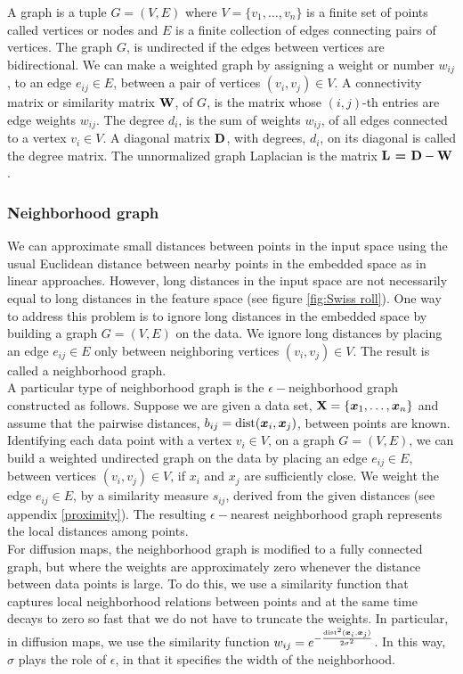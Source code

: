 A graph is a tuple $G = (V,E)$ where $V = \{v_1, \ldots , v_n\}$ is a finite set of points called vertices or nodes and $E$ is a finite collection of edges connecting pairs of vertices. The graph $G$, is undirected if the edges between vertices are bidirectional.
We can make a weighted graph by assigning a weight or number $w_{ij}$, to an edge $e_{ij} \in E$, between a pair of vertices $(v_i, v_j) \in V$. A connectivity matrix or similarity matrix $\textbf{W}$, of $G$, is the matrix whose $(i,j)$-th entries are edge weights $w_{ij}$.
The degree $d_i$, is the sum of weights $w_{ij}$, of all edges connected to a vertex $v_i \in V$.
A diagonal matrix $\textbf{D}$, with degrees, $d_{i}$, on its diagonal is called the degree matrix.
The unnormalized graph Laplacian is the  matrix $\textbf{L = D} - \textbf{W}$.


\subsubsection{Neighborhood graph}
We can approximate small distances between points in the input space using the usual Euclidean distance between nearby points in the embedded space as in linear approaches. However, long distances in the input space are not necessarily equal to long distances in the feature space (see figure \ref{fig:Swiss roll}). One way to address this problem is to ignore long distances in the embedded space by building a graph $G = (V, E)$ on the data. We ignore long distances by placing an edge $e_{ij} \in E$ only between neighboring vertices $(v_i, v_j) \in V$. The result is called 
a neighborhood graph.\\

A particular type of neighborhood graph is the $\epsilon-$neighborhood graph constructed as follows. Suppose we are given a data set, $\textbf{X} =  \{\boldsymbol{x}_{1}, \ldots, \boldsymbol{x}_{n} \}$ and assume that the pairwise distances, $b_{ij} = \text{dist}(\boldsymbol{x}_{i}, \boldsymbol{x}_{j})$, between points are known. Identifying each data point with a vertex $v_{i} \in V$, on a graph $G = (V, E)$, we can build a weighted  undirected graph on the data by placing an edge $e_{ij} \in E$, between vertices $(v_i, v_j) \in V$, if $x_i$ and $x_j$ are sufficiently close. We weight the edge $e_{ij} \in E$, by a similarity measure $s_{ij}$, derived from the given distances (see appendix \ref{proximity}). The resulting $\epsilon-$nearest neighborhood graph represents the local distances among points.\\

For diffusion maps, the neighborhood graph is modified to a fully connected graph, but where the weights are approximately zero whenever the distance between data points is large.
To do this, we use a similarity function that captures local neighborhood relations between points and at the same time decays to zero so fast that we do not have to truncate the weights. In particular, in diffusion maps, we use the similarity function 
$w_{ij} = e^{- \frac{\text{dist}^{2}(\boldsymbol{x}_i, \boldsymbol{x}_j)}{2 \sigma^2}}$. 
In this way, $\sigma$ plays the role of $\epsilon$, in that it specifies the width of the neighborhood.

